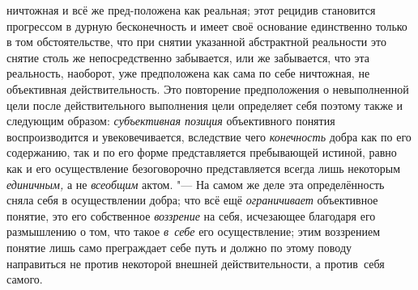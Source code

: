 ничтожная и всё же пред-положена как реальная; этот рецидив становится
прогрессом в дурную бесконечность и имеет своё основание единственно только
в том обстоятельстве, что при снятии указанной абстрактной реальности это
снятие столь же непосредственно забывается, или же забывается, что эта
реальность, наоборот, уже предположена как сама по себе ничтожная, не
объективная действительность. Это повторение предположения о невыполненной
цели после действительного выполнения цели определяет себя поэтому также и
следующим образом: {\em субъективная
позиция} объективного понятия воспроизводится и
увековечивается, вследствие чего
{\em конечность} добра
как по его содержанию, так и по его форме представляется
пребывающей истиной, равно как и его осуществление безоговорочно
представляется всегда лишь некоторым
{\em единичным,} а не
{\em всеобщим} актом. "---
На самом же деле эта определённость сняла себя в
осуществлении добра; что всё ещё
{\em ограничивает}
объективное понятие, это его собственное
{\em воззрение} на себя,
исчезающее благодаря его размышлению о том, что такое
{\em в~себе} его
осуществление; этим воззрением понятие лишь само преграждает себе путь и
должно по этому поводу направиться не против некоторой внешней
действительности, а против~себя самого.

